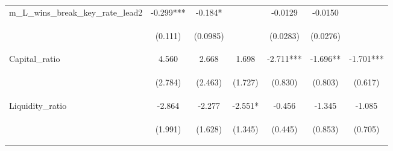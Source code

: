 \documentclass[]{article}
\begin{document}
\begin{center}
\begin{tabular}{lcccccc}
m\_L\_wins\_break\_key\_rate\_lead2 & -0.299*** & -0.184* &  & -0.0129 & -0.0150 &  \\
\vspace{4pt} & \begin{footnotesize}(0.111)\end{footnotesize} & \begin{footnotesize}(0.0985)\end{footnotesize} & \begin{footnotesize}\end{footnotesize} & \begin{footnotesize}(0.0283)\end{footnotesize} & \begin{footnotesize}(0.0276)\end{footnotesize} & \begin{footnotesize}\end{footnotesize} \\
Capital\_ratio & 4.560 & 2.668 & 1.698 & -2.711*** & -1.696** & -1.701*** \\
\vspace{4pt} & \begin{footnotesize}(2.784)\end{footnotesize} & \begin{footnotesize}(2.463)\end{footnotesize} & \begin{footnotesize}(1.727)\end{footnotesize} & \begin{footnotesize}(0.830)\end{footnotesize} & \begin{footnotesize}(0.803)\end{footnotesize} & \begin{footnotesize}(0.617)\end{footnotesize} \\
Liquidity\_ratio & -2.864 & -2.277 & -2.551* & -0.456 & -1.345 & -1.085 \\
\vspace{4pt} & \begin{footnotesize}(1.991)\end{footnotesize} & \begin{footnotesize}(1.628)\end{footnotesize} & \begin{footnotesize}(1.345)\end{footnotesize} & \begin{footnotesize}(0.445)\end{footnotesize} & \begin{footnotesize}(0.853)\end{footnotesize} & \begin{footnotesize}(0.705)\end{footnotesize} \\

\end{tabular}
\end{center}
\end{document}
